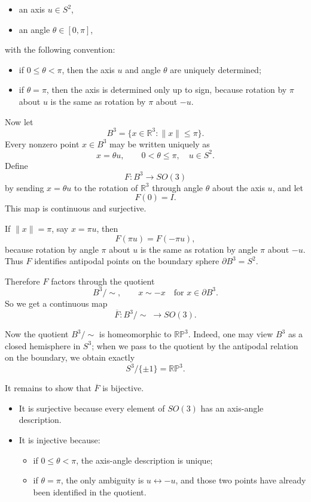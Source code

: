 \begin{solution}
\begin{itemize}
	\item an axis \(u\in S^2\),
	\item an angle \(\theta\in [0,\pi]\),
\end{itemize}
with the following convention:

\begin{itemize}
	\item if \(0\le \theta<\pi\), then the axis \(u\) and angle \(\theta\) are uniquely determined;
	\item if \(\theta=\pi\), then the axis is determined only up to sign, because rotation by \(\pi\) about \(u\) is the same as rotation by \(\pi\) about \(-u\).
\end{itemize}

Now let
\[
B^3=\{x\in \mathbb R^3:\|x\|\le \pi\}.
\]
Every nonzero point \(x\in B^3\) may be written uniquely as
\[
x=\theta u,
\qquad
0<\theta\le \pi,\quad u\in S^2.
\]
Define
\[
F:B^3\to SO(3)
\]
by sending \(x=\theta u\) to the rotation of \(\mathbb R^3\) through angle \(\theta\) about the axis \(u\), and let
\[
F(0)=I.
\]
This map is continuous and surjective.

If \(\|x\|=\pi\), say \(x=\pi u\), then
\[
F(\pi u)=F(-\pi u),
\]
because rotation by angle \(\pi\) about \(u\) is the same as rotation by angle \(\pi\) about \(-u\). Thus \(F\) identifies antipodal points on the boundary sphere \(\partial B^3=S^2\).

Therefore \(F\) factors through the quotient
\[
B^3/\!\sim,
\qquad
x\sim -x \quad \text{for } x\in \partial B^3.
\]
So we get a continuous map
\[
\overline{F}:B^3/\!\sim\;\to SO(3).
\]

Now the quotient \(B^3/\!\sim\) is homeomorphic to \(\mathbb{RP}^3\). Indeed, one may view \(B^3\) as a closed hemisphere in \(S^3\); when we pass to the quotient by the antipodal relation on the boundary, we obtain exactly
\[
S^3/\{\pm 1\}=\mathbb{RP}^3.
\]

It remains to show that \(\overline{F}\) is bijective.

\begin{itemize}
	\item It is surjective because every element of \(SO(3)\) has an axis-angle description.
	\item It is injective because:
	\begin{itemize}
		\item if \(0\le \theta<\pi\), the axis-angle description is unique;
		\item if \(\theta=\pi\), the only ambiguity is \(u\leftrightarrow -u\), and those two points have already been identified in the quotient.
	\end{itemize}
\end{itemize}


\end{solution}
